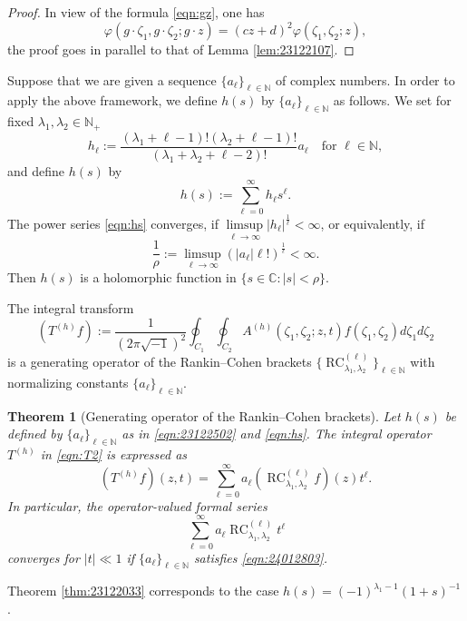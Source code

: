 \documentclass[12pt]{amsart}
\newcommand{\RC}{\operatorname{RC}}
\theoremstyle{plain} %
\newtheorem{theorem}{Theorem}
\theoremstyle{definition} %
\theoremstyle{remark} %
\begin{document}
\begin{proof}
In view of the formula \eqref{eqn:gz}, 
one has
\[
  \varphi(g \cdot \zeta_1, g \cdot \zeta_2; g\cdot z)
 =
  (c z + d)^2 \varphi(\zeta_1, \zeta_2; z), 
\]
the proof goes in parallel to that of Lemma \ref{lem:23122107}.  
\end{proof}



Suppose that we are given a sequence $\{a_{\ell}\}_{\ell \in {\mathbb{N}}}$
 of complex numbers.  
In order to apply the above framework, 
 we define $h(s)$
 by $\{a_{\ell}\}_{\ell \in {\mathbb{N}}}$ as follows.  
We set for fixed $\lambda_1, \lambda_2 \in {\mathbb{N}}_+$
\begin{equation}
\label{eqn:23122502}
h_{\ell}:=\frac{(\lambda_1+\ell-1)!(\lambda_2+\ell-1)!}
               {(\lambda_1+\lambda_2+\ell-2)!} a_{\ell}
\quad
\text{for $\ell \in {\mathbb{N}}$}, 
\end{equation}
and define $h(s)$ by 
\begin{equation}
\label{eqn:hs}
h(s):=\underset{\ell=0}{\overset{\infty}\sum} h_{\ell} s^{\ell}.  
\end{equation}
The power series \eqref{eqn:hs} converges, 
 if $\underset{\ell \to \infty}{\limsup}|h_{\ell}|^{\frac 1 \ell}<\infty$, 
 or equivalently, 
 if 
\begin{equation}
\label{eqn:24012803}
 \frac 1 \rho:= \limsup_{\ell \to \infty} (|a_{\ell}| \ell!)^{\frac 1 \ell}
 <\infty.  
\end{equation}
Then $h(s)$ is a holomorphic function
 in $\{s \in {\mathbb{C}}:|s|<\rho\}$.  

The integral transform 
\begin{equation}
\label{eqn:T2}
  (T^{(h)}f):=\frac 1 {(2 \pi \sqrt{-1})^2} \oint_{C_1} \oint_{C_2}
  A^{(h)}(\zeta_1, \zeta_2;z, t) f(\zeta_1, \zeta_2) d \zeta_1 d \zeta_2
\end{equation}
is a generating operator of the Rankin--Cohen brackets
 $\{\RC_{\lambda_1, \lambda_2}^{(\ell)}\}_{\ell \in {\mathbb{N}}}$
 with normalizing constants $\{a_{\ell}\}_{\ell \in {\mathbb{N}}}$.  

\begin{theorem}
[Generating operator of the Rankin--Cohen brackets]
\label{thm:T}
Let $h(s)$ be defined by $\{a_{\ell}\}_{\ell \in {\mathbb{N}}}$
 as in \eqref{eqn:23122502} and \eqref{eqn:hs}.  
The integral operator $T^{(h)}$ in \eqref{eqn:T2} is expressed as 
\begin{equation}
\label{eqn:Thf}
  (T^{(h)} f) (z, t)
=\sum_{\ell=0}^{\infty}
 a_{\ell} (\RC_{\lambda_1, \lambda_2}^{(\ell)}f)(z) t^{\ell}.  
\end{equation}
In particular, 
 the operator-valued formal series
\[
  \sum_{\ell=0}^{\infty} a_{\ell} \RC_{\lambda_1, \lambda_2}^{(\ell)} t^{\ell}
\]
 converges for $|t|\ll 1$
 if $\{a_{\ell}\}_{\ell \in {\mathbb{N}}}$ satisfies
 \eqref{eqn:24012803}.  
\end{theorem}
Theorem \ref{thm:23122033} corresponds to the case
 $h(s)=(-1)^{\lambda_1-1} (1+s)^{-1}$.  
\end{document}
